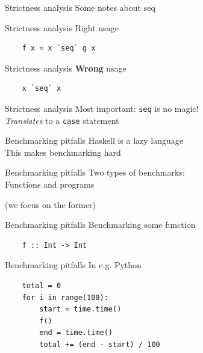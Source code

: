 \documentclass[20pt]{beamer}
\newcommand{\vspaced}{
    \vspace{5mm}
}
\begin{document}
\begin{frame}{Strictness analysis}
    Some notes about seq
\end{frame}

\begin{frame}[fragile]{Strictness analysis}
    Right usage
    \vspaced
    \begin{lstlisting}
    f x = x `seq` g x
    \end{lstlisting}
\end{frame}

\begin{frame}[fragile]{Strictness analysis}
    \textbf{Wrong} usage
    \vspaced
    \begin{lstlisting}
    x `seq` x
    \end{lstlisting}
\end{frame}

\begin{frame}[fragile]{Strictness analysis}
    Most important: \texttt{seq} is no magic! \\
    \textit{Translates} to a \texttt{case} statement
\end{frame}




\begin{frame}{Benchmarking pitfalls}
    Haskell is a lazy language \\
    This makes benchmarking hard
\end{frame}

\begin{frame}{Benchmarking pitfalls}
    Two types of benchmarks: \\
    Functions and programs \\
    \vspaced
    (we focus on the former)
\end{frame}

\begin{frame}[fragile]{Benchmarking pitfalls}
    Benchmarking some function

    \begin{lstlisting}
    f :: Int -> Int
    \end{lstlisting}
\end{frame}

\begin{frame}[fragile]{Benchmarking pitfalls}
    In e.g. Python
    \vspaced
    \begin{lstlisting}
    total = 0
    for i in range(100):
        start = time.time()
        f()
        end = time.time()
        total += (end - start) / 100
    \end{lstlisting}
\end{frame}
\end{document}
